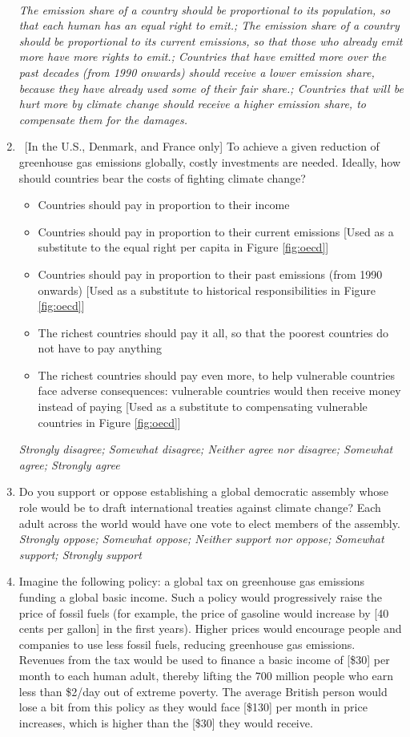 \begin{enumerate}
\\ \textit{The emission share of a country should be proportional to its population, so that each human has an equal right to emit.; The emission share of a country should be proportional to its current emissions, so that those who already emit more have more rights to emit.; Countries that have emitted more over the past decades (from 1990 onwards) should receive a lower emission share, because they have already used some of their fair share.; Countries that will be hurt more by climate change should receive a higher emission share, to compensate them for the damages.}
\item \label{q:burden_sharing_asterisk} ~[In the U.S., Denmark, and France only] To achieve a given reduction of greenhouse gas emissions globally, costly investments are needed.
Ideally, how should countries bear the costs of fighting climate change?
 \begin{itemize}
\item Countries should pay in proportion to their income
\item Countries should pay in proportion to their current emissions [Used as a substitute to the equal right per capita in Figure \ref{fig:oecd}]
\item Countries should pay in proportion to their past emissions (from 1990 onwards) [Used as a substitute to historical responsibilities in Figure \ref{fig:oecd}]
\item The richest countries should pay it all, so that the poorest countries do not have to pay anything
\item The richest countries should pay even more, to help vulnerable countries face adverse consequences: vulnerable countries would then receive money instead of paying [Used as a substitute to compensating vulnerable countries in Figure \ref{fig:oecd}]
\end{itemize} 
\textit{Strongly disagree; Somewhat disagree; Neither agree nor disagree; Somewhat agree; Strongly agree}
\item Do you support or oppose establishing a global democratic assembly whose role would be to draft international treaties against climate change? Each adult across the world would have one vote to elect members of the assembly.
\\ \textit{Strongly oppose; Somewhat oppose; Neither support nor oppose; Somewhat support; Strongly support}
\item Imagine the following policy: a global tax on greenhouse gas emissions funding a global basic income. 
Such a policy would progressively raise the price of fossil fuels (for example, the price of gasoline would increase by [40 cents per gallon] in the first years). Higher prices would encourage people and companies to use less fossil fuels, reducing greenhouse gas emissions. Revenues from the tax would be used to finance a basic income of [\$30] per month to each human adult, thereby lifting the 700 million people who earn less than \$2/day out of extreme poverty. 
The average British person would lose a bit from this policy as they would face [\$130] per month in price increases, which is higher than the [\$30] they would receive.


\end{enumerate}
